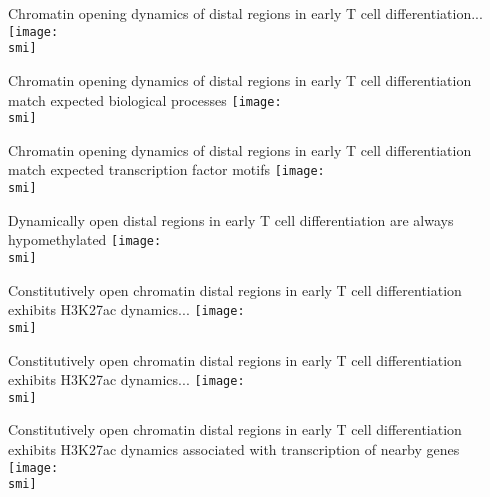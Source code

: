 \documentclass[10pt]{beamer}
\def\smi{out/ln/updir/mw-gcthesis-oral/library.bib}
\begin{document}
\begin{frame}{Chromatin opening dynamics of distal regions in early T cell differentiation...}
  \def\smi{out/ln/updir/mw-gcthesis-oral/ink/atac-clusters/atac.pdf}
  \texttt{[image: \\smi]}
\end{frame}
\begin{frame}{Chromatin opening dynamics of distal regions in early T cell differentiation match expected biological processes} 
  \def\smi{out/ln/updir/mw-gcthesis-oral/ink/atac-clusters/atac-gobp.pdf}
  \texttt{[image: \\smi]}
\end{frame}
\begin{frame}{Chromatin opening dynamics of distal regions in early T cell differentiation match expected transcription factor motifs} 
  \def\smi{out/ln/updir/mw-gcthesis-oral/ink/atac-clusters/atac-motifs.pdf}
  \texttt{[image: \\smi]}
\end{frame}
\begin{frame}{Dynamically open distal regions in early T cell differentiation are always hypomethylated}
  \def\smi{out/ln/updir/mw-gcthesis-oral/ink/atac-clusters/atac-wgbs.pdf}
  \texttt{[image: \\smi]}
\end{frame}
\begin{frame}{Constitutively open chromatin distal regions in early T cell differentiation exhibits H3K27ac dynamics...}
  \def\smi{out/ln/updir/mw-gcthesis-oral/ink/atac-clusters/atac-wgbs-h3k27ac.pdf}
  \texttt{[image: \\smi]}
\end{frame}
\begin{frame}{Constitutively open chromatin distal regions in early T cell differentiation exhibits H3K27ac dynamics...}
  \def\smi{out/ln/updir/mw-gcthesis-oral/ink/atac-clusters/h3k27ac.pdf}
  \texttt{[image: \\smi]}
\end{frame}
\begin{frame}{Constitutively open chromatin distal regions in early T cell differentiation exhibits H3K27ac dynamics associated with transcription of nearby genes}
  \def\smi{out/ln/updir/mw-gcthesis-oral/ink/atac-clusters/rnaseq-h3k27ac-no-casero.pdf}
  \texttt{[image: \\smi]}
\end{frame}
\end{document}
